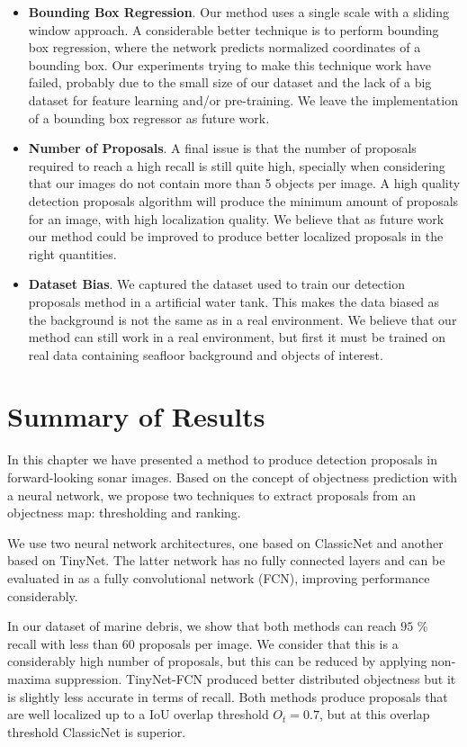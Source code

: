 \begin{itemize}
	\item \textbf{Bounding Box Regression}. Our method uses a single scale with a sliding window approach. A considerable  better technique is to perform bounding box regression, where the network predicts normalized coordinates of a bounding box. Our experiments trying to make this technique work have failed, probably due to the small size of our dataset and the lack of a big dataset for feature learning and/or pre-training. We leave the implementation of a bounding box regressor as future work.
	\item \textbf{Number of Proposals}. A final issue is that the number of proposals required to reach a high recall is still quite high, specially when considering that our images do not contain more than 5 objects per image. A high quality detection proposals algorithm will produce the minimum amount of proposals for an image, with high localization quality. We believe that as future work our method could be improved to produce better localized proposals in the right quantities.
	\item \textbf{Dataset Bias}. We captured the dataset used to train our detection proposals method in a artificial water tank. This makes the data biased as the background is not the same as in a real environment. We believe that our method can still work in a real environment, but first it must be trained on real data containing seafloor background and objects of interest.
\end{itemize}

\section{Summary of Results}

In this chapter we have presented a method to produce detection proposals in forward-looking sonar images. Based on the concept of objectness prediction with a neural network, we propose two techniques to extract proposals from an objectness map: thresholding and ranking.

We use two neural network architectures, one based on ClassicNet and another based on TinyNet. The latter network has no fully connected layers and can be evaluated in as a fully convolutional network (FCN), improving performance considerably.

In our dataset of marine debris, we show that both methods can reach $95$ \% recall with less than 60 proposals per image. We consider that this is a considerably high number of proposals, but this can be reduced by applying non-maxima suppression. TinyNet-FCN produced better distributed objectness but it is slightly less accurate in terms of recall. Both methods produce proposals that are well localized up to a IoU overlap threshold $O_t = 0.7$, but at this overlap threshold ClassicNet is superior.

